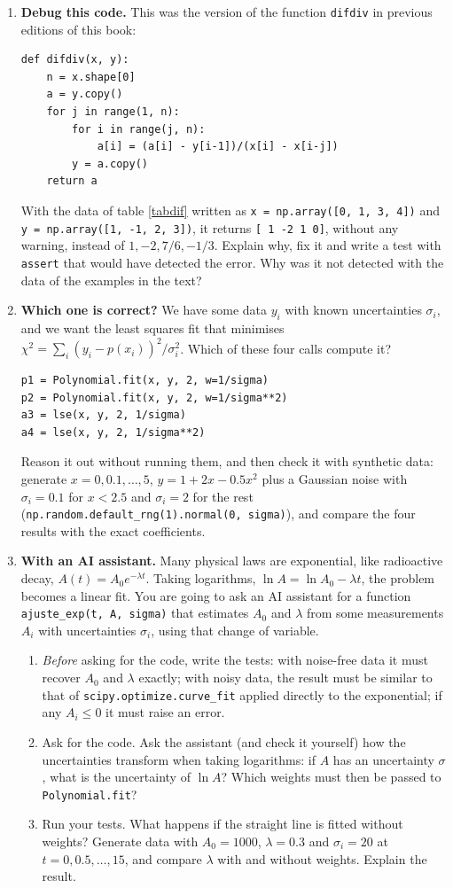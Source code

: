 \begin{enumerate}
\item \label{ej:depura_difdiv-en} \textbf{Debug this code.} This was the version of the function \texttt{difdiv} in previous editions of this book:
\begin{verbatim}
def difdiv(x, y):
    n = x.shape[0]
    a = y.copy()
    for j in range(1, n):
        for i in range(j, n):
            a[i] = (a[i] - y[i-1])/(x[i] - x[i-j])
        y = a.copy()
    return a
\end{verbatim}
With the data of table \ref{tabdif} written as \texttt{x = np.array([0, 1, 3, 4])} and \texttt{y = np.array([1, -1, 2, 3])}, it returns \texttt{[ 1 -2  1  0]}, without any warning, instead of $1, -2, 7/6, -1/3$. Explain why, fix it and write a test with \texttt{assert} that would have detected the error. Why was it not detected with the data of the examples in the text?

\item \label{ej:pesos-en} \textbf{Which one is correct?} We have some data $y_i$ with known uncertainties $\sigma_i$, and we want the least squares fit that minimises $\chi^2=\sum_i (y_i-p(x_i))^2/\sigma_i^2$. Which of these four calls compute it?
\begin{verbatim}
p1 = Polynomial.fit(x, y, 2, w=1/sigma)
p2 = Polynomial.fit(x, y, 2, w=1/sigma**2)
a3 = lse(x, y, 2, 1/sigma)
a4 = lse(x, y, 2, 1/sigma**2)
\end{verbatim}
Reason it out without running them, and then check it with synthetic data: generate $x=0,0.1,\dots,5$, $y=1+2x-0.5x^2$ plus a Gaussian noise with $\sigma_i=0.1$ for $x<2.5$ and $\sigma_i=2$ for the rest (\texttt{np.random.default\_rng(1).normal(0, sigma)}), and compare the four results with the exact coefficients.

\item \label{ej:exp_ia-en} \textbf{With an AI assistant.} Many physical laws are exponential, like radioactive decay, $A(t)=A_0e^{-\lambda t}$. Taking logarithms, $\ln A=\ln A_0-\lambda t$, the problem becomes a linear fit. You are going to ask an AI assistant for a function \texttt{ajuste\_exp(t, A, sigma)} that estimates $A_0$ and $\lambda$ from some measurements $A_i$ with uncertainties $\sigma_i$, using that change of variable.
\begin{enumerate}
\item \emph{Before} asking for the code, write the tests: with noise-free data it must recover $A_0$ and $\lambda$ exactly; with noisy data, the result must be similar to that of \texttt{scipy.optimize.curve\_fit} applied directly to the exponential; if any $A_i\leq 0$ it must raise an error.
\item Ask for the code. Ask the assistant (and check it yourself) how the uncertainties transform when taking logarithms: if $A$ has an uncertainty $\sigma$, what is the uncertainty of $\ln A$? Which weights must then be passed to \texttt{Polynomial.fit}?
\item Run your tests. What happens if the straight line is fitted without weights? Generate data with $A_0=1000$, $\lambda=0.3$ and $\sigma_i=20$ at $t=0,0.5,\dots,15$, and compare $\lambda$ with and without weights. Explain the result.
\end{enumerate}
\end{enumerate}
